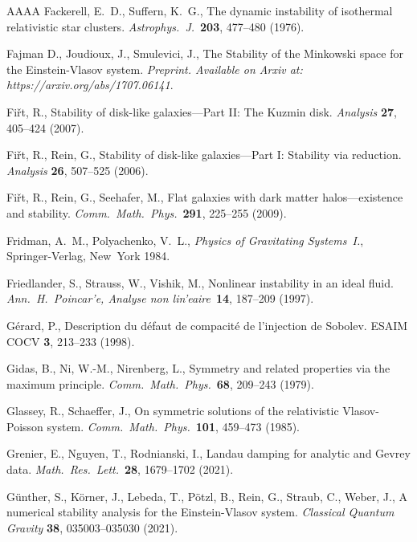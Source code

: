 \documentclass[11pt]{article}
\begin{document}
\begin{thebibliography}{AAAA}
  {\sc Fackerell, E.~D., Suffern, K.~G.},
  The dynamic instability of isothermal relativistic star clusters.
  {\em Astrophys.\ J.}\ 
  {\bf 203}, 477--480 (1976).

  {\sc Fajman D., Joudioux, J.,  Smulevici, J.},
  The Stability of the Minkowski space for the Einstein-Vlasov system.
  {\em Preprint. Available on Arxiv at: https://arxiv.org/abs/1707.06141}.
  
  {\sc Fi\v rt, R.},
  Stability of disk-like galaxies---Part II: The Kuzmin disk.
  {\em Analysis}
  {\bf 27}, 405--424 (2007).
  
  {\sc Fi\v{r}t, R., Rein, G.},
  Stability of disk-like galaxies---Part I: Stability via reduction.
  {\em Analysis}
  {\bf 26}, 507--525 (2006).

  {\sc Fi\v{r}t, R., Rein, G., Seehafer, M.},
  Flat galaxies with dark matter halos---existence and stability.
  {\em Comm.\ Math.\ Phys.}\ 
  {\bf 291}, 225--255 (2009).
  
  {\sc Fridman, A.~M., Polyachenko, V.~L.},
  \textit{Physics of Gravitating Systems\ I.},
  Springer-Verlag, New~York 1984.

  {\sc Friedlander, S., Strauss, W., Vishik, M.},
  Nonlinear instability in an ideal fluid.
  {\em Ann.\ H.\ Poincar'e, Analyse non lin'eaire}\
  {\bf 14}, 187--209 (1997).

\bibitem{Ge1998} %
  {\sc G\'erard, P.},
  Description du d\'efaut de compacit\'e de l'injection de Sobolev.
  ESAIM COCV
  {\bf 3}, 213--233 (1998).

  {\sc Gidas, B., Ni, W.-M., Nirenberg, L.},
  Symmetry and related properties via the maximum principle.
  {\em Comm.\ Math.\ Phys.}\ 
  {\bf 68}, 209--243 (1979).

\bibitem{GlSch} %
  {\sc Glassey, R., Schaeffer, J.},
  On symmetric solutions of the relativistic Vlasov-Poisson system.
  {\em Comm.\ Math.\ Phys.}\  
  {\bf 101}, 459--473 (1985).

\bibitem{GrNgRo2020} %
  {\sc Grenier, E., Nguyen, T., Rodnianski, I.},
  Landau damping for analytic and Gevrey data.
  {\em Math.\ Res.\ Lett.}\
  {\bf 28}, 1679--1702 (2021).
  
\bibitem{Gue_e_a} %
  {\sc G\"unther, S., K\"orner, J., Lebeda, T., P\"otzl, B., Rein, G.,
    Straub, C., Weber, J.},
  A numerical stability analysis for the Einstein-Vlasov system.
  {\em Classical Quantum Gravity} 
  {\bf 38}, 035003--035030 (2021).


\end{thebibliography}
\end{document}
